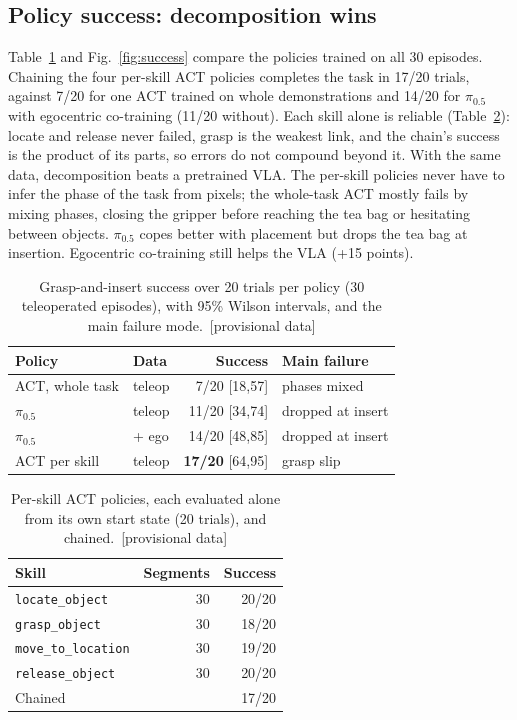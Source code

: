 \documentclass[10pt,twocolumn,letterpaper]{article}
\newif\ifprovisional \provisionaltrue
\newcommand{\prov}[1]{\ifprovisional\textcolor{prov}{#1}\else#1\fi}
\newcommand{\provtag}{\ifprovisional\ \textcolor{prov}{[provisional data]}\fi}
\newcommand{\code}[1]{\texttt{\small #1}}
\begin{document}
\subsection{Policy success: decomposition wins}
Table~\ref{tab:success} and Fig.~\ref{fig:success} compare the policies trained on all 30 episodes. Chaining the four
per-skill ACT policies completes the task in \prov{17/20} trials, against \prov{7/20} for one ACT trained on whole
demonstrations and \prov{14/20} for $\pi_{0.5}$ with egocentric co-training (\prov{11/20} without). Each skill alone is
reliable (Table~\ref{tab:skills}): locate and release never failed, grasp is the weakest link, and the chain's success
is the product of its parts, so errors do not compound beyond it. With the same data, decomposition beats a
pretrained VLA. The per-skill policies never have to infer the phase of the task from pixels; the whole-task ACT
mostly fails by mixing phases, closing the gripper before reaching the tea bag or hesitating between objects.
$\pi_{0.5}$ copes better with placement but drops the tea bag at insertion. Egocentric co-training still helps the VLA
(\prov{+15} points).

\begin{table}[t]
\centering\small
\caption{Grasp-and-insert success over 20 trials per policy (30 teleoperated episodes), with 95\% Wilson intervals,
and the main failure mode.\provtag}
\label{tab:success}
\setlength{\tabcolsep}{3pt}
\begin{tabular}{@{}llrl@{}}
\toprule
Policy & Data & Success & Main failure\\
\midrule
ACT, whole task & teleop & \prov{7/20} {\scriptsize\prov{[18,57]}} & \prov{phases mixed}\\
$\pi_{0.5}$ & teleop & \prov{11/20} {\scriptsize\prov{[34,74]}} & \prov{dropped at insert}\\
$\pi_{0.5}$ & + ego & \prov{14/20} {\scriptsize\prov{[48,85]}} & \prov{dropped at insert}\\
ACT per skill & teleop & \prov{\textbf{17/20}} {\scriptsize\prov{[64,95]}} & \prov{grasp slip}\\
\bottomrule
\end{tabular}
\end{table}

\begin{table}[t]
\centering\small
\caption{Per-skill ACT policies, each evaluated alone from its own start state (20 trials), and chained.\provtag}
\label{tab:skills}
\begin{tabular}{@{}lrr@{}}
\toprule
Skill & Segments & Success\\
\midrule
\code{locate\_object} & 30 & \prov{20/20}\\
\code{grasp\_object} & 30 & \prov{18/20}\\
\code{move\_to\_location} & 30 & \prov{19/20}\\
\code{release\_object} & 30 & \prov{20/20}\\
\midrule
Chained & & \prov{17/20}\\
\bottomrule
\end{tabular}
\end{table}
\end{document}

